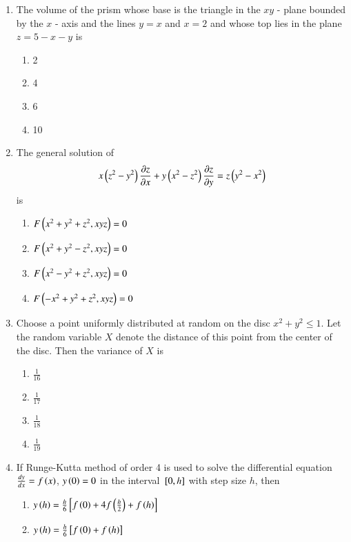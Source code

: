 \documentclass[journal]{IEEEtran}
\begin{document}
\begin{enumerate}
\item The volume of the prism whose base is the triangle in the $xy$ - plane bounded by the $x$ - axis and the lines $y = x$ and $x = 2$ and whose top lies in the plane $z = 5 - x - y$ is
    \begin{enumerate}
        \item 2
        \item 4
        \item 6
        \item 10 \\
    \end{enumerate}
\item The general solution of 
\begin{align*}
    x\left(z^2 - y^2\right)\frac{\partial z}{\partial x} + y\left(x^2 - z^2\right)\frac{\partial z}{\partial y} = z\left(y^2 - x^2\right)
\end{align*}
is
\begin{enumerate}
    \item $F\left(x^2 + y^2 + z^2, xyz\right) = 0$
    \item $F\left(x^2 + y^2 - z^2, xyz\right) = 0$
    \item $F\left(x^2 - y^2 + z^2, xyz\right) = 0$
    \item $F\left(-x^2 + y^2 + z^2, xyz\right) = 0$ \\
\end{enumerate}
\item Choose a point uniformly distributed at random on the disc $x^2 + y^2 \leq 1$. Let the random variable $X$ denote the distance of this point from the center of the disc. Then the variance of $X$ is 
\begin{enumerate}
    \item $\frac{1}{16}$
    \item $\frac{1}{17}$
    \item $\frac{1}{18}$
    \item $\frac{1}{19}$ \\
\end{enumerate}
\item If Runge-Kutta method of order 4 is used to solve the differential equation $\frac{dy}{dx} = f\left(x\right)$, $y\left(0\right) = 0$ in the interval ${}\left[0, h\right]$ with step size $h$, then
 \begin{enumerate}
     \item $y\left(h\right) = \frac{h}{6}{}\left[f\left(0\right) + 4f\left(\frac{h}{2}\right) + f\left(h\right)\right]$
     \item $y\left(h\right) = \frac{h}{6}{}\left[f\left(0\right) + f\left(h\right)\right]$

\end{enumerate}
\end{enumerate}
\end{document}
